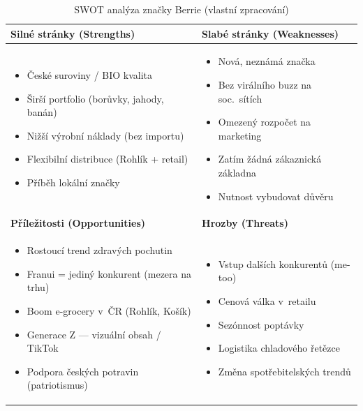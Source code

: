 \begin{table}[H]
\centering
\caption{SWOT analýza značky Berrie (vlastní zpracování)}
\label{tab:swot}
\begin{tabularx}{\textwidth}{|X|X|}
\hline
\textbf{Silné stránky (Strengths)} & \textbf{Slabé stránky (Weaknesses)} \\
\hline
\begin{itemize}[nosep,leftmargin=*]
  \item České suroviny / BIO kvalita
  \item Širší portfolio (borůvky, jahody, banán)
  \item Nižší výrobní náklady (bez importu)
  \item Flexibilní distribuce (Rohlík + retail)
  \item Příběh lokální značky
\end{itemize}
&
\begin{itemize}[nosep,leftmargin=*]
  \item Nová, neznámá značka
  \item Bez virálního buzz na soc.\ sítích
  \item Omezený rozpočet na marketing
  \item Zatím žádná zákaznická základna
  \item Nutnost vybudovat důvěru
\end{itemize}
\\
\hline
\textbf{Příležitosti (Opportunities)} & \textbf{Hrozby (Threats)} \\
\hline
\begin{itemize}[nosep,leftmargin=*]
  \item Rostoucí trend zdravých pochutin
  \item Franui = jediný konkurent (mezera na trhu)
  \item Boom e-grocery v~ČR (Rohlík, Košík)
  \item Generace Z — vizuální obsah / TikTok
  \item Podpora českých potravin (patriotismus)
\end{itemize}
&
\begin{itemize}[nosep,leftmargin=*]
  \item Vstup dalších konkurentů (me-too)
  \item Cenová válka v~retailu
  \item Sezónnost poptávky
  \item Logistika chladového řetězce
  \item Změna spotřebitelských trendů
\end{itemize}
\\
\hline
\end{tabularx}
\end{table}

